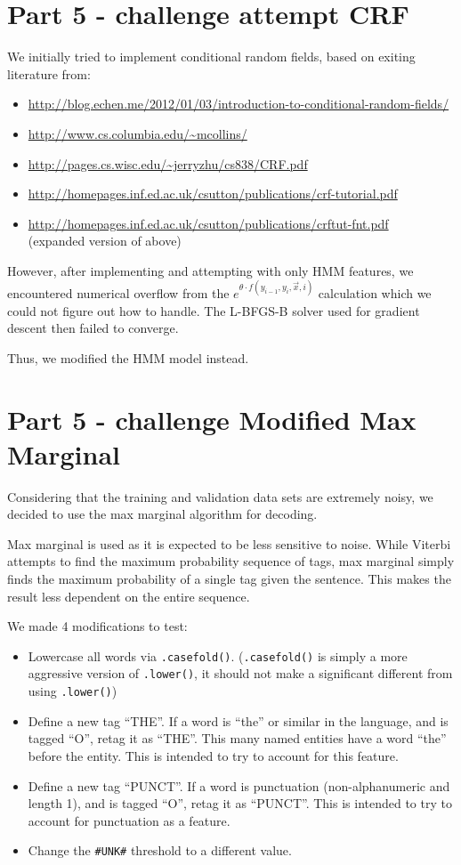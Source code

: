 \documentclass[12pt]{article}
\begin{document}
\pagebreak

\section{Part 5 - challenge attempt CRF}

We initially tried to implement conditional random fields, based on exiting literature from:
\begin{itemize}
\item \url{http://blog.echen.me/2012/01/03/introduction-to-conditional-random-fields/}
\item \url{http://www.cs.columbia.edu/~mcollins/}
\item \url{http://pages.cs.wisc.edu/~jerryzhu/cs838/CRF.pdf}
\item \url{http://homepages.inf.ed.ac.uk/csutton/publications/crf-tutorial.pdf}
\item \url{http://homepages.inf.ed.ac.uk/csutton/publications/crftut-fnt.pdf} \\
      (expanded version of above)
\end{itemize}

However, after implementing and attempting with only HMM features, we encountered numerical overflow from the \(e^{\theta \cdot f(y_{i-1}, y_i, \vec{x}, i)}\) calculation which we could not figure out how to handle. The L-BFGS-B solver used for gradient descent then failed to converge.

Thus, we modified the HMM model instead.

\section{Part 5 - challenge Modified Max Marginal}

Considering that the training and validation data sets are extremely noisy, we decided to use the max marginal algorithm for decoding.

Max marginal is used as it is expected to be less sensitive to noise. While Viterbi attempts to find the maximum probability sequence of tags, max marginal simply finds the maximum probability of a single tag given the sentence. This makes the result less dependent on the entire sequence.

We made 4 modifications to test:
\begin{itemize}
\item Lowercase all words via \verb|.casefold()|. (\verb|.casefold()| is simply a more aggressive version of \verb|.lower()|, it should not make a significant different from using \verb|.lower()|)
\item Define a new tag ``THE''. If a word is ``the'' or similar in the language, and is tagged ``O'', retag it as ``THE''. This many named entities have a word ``the'' before the entity. This is intended to try to account for this feature.
\item Define a new tag ``PUNCT''. If a word is punctuation (non-alphanumeric and length 1), and is tagged ``O'', retag it as ``PUNCT''. This is intended to try to account for punctuation as a feature.
\item Change the \verb|#UNK#| threshold to a different value.
\end{itemize}
\end{document}

